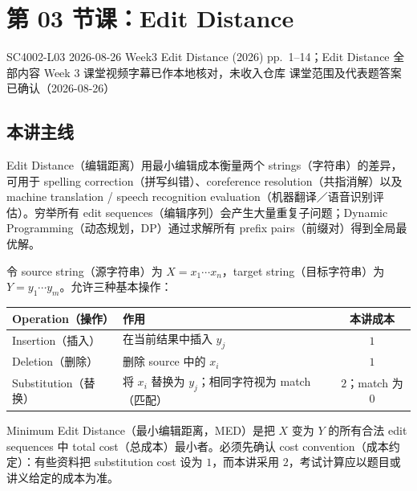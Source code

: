 
\section{第 03 节课：Edit Distance}
\label{lecture:SC4002-L03}

\lecturemeta
  {SC4002-L03}
  {2026-08-26}
  {Week3 Edit Distance (2026)}
  {pp.~1--14；Edit Distance 全部内容}
  {Week 3 课堂视频字幕已作本地核对，未收入仓库}
  {课堂范围及代表题答案已确认（2026-08-26）}

\subsection{本讲主线}

Edit Distance（编辑距离）用最小编辑成本衡量两个 strings（字符串）的差异，可用于 spelling correction（拼写纠错）、coreference resolution（共指消解）以及 machine translation / speech recognition evaluation（机器翻译／语音识别评估）。穷举所有 edit sequences（编辑序列）会产生大量重复子问题；Dynamic Programming（动态规划，DP）通过求解所有 prefix pairs（前缀对）得到全局最优解。


令 source string（源字符串）为 $X=x_1\cdots x_n$，target string（目标字符串）为 $Y=y_1\cdots y_m$。允许三种基本操作：

\begin{center}
\small
\begin{tabularx}{0.88\textwidth}{@{}>{\raggedright\arraybackslash}p{3.2cm}Xc@{}}
  \toprule
  Operation（操作） & 作用 & 本讲成本 \\
  \midrule
  Insertion（插入） & 在当前结果中插入 $y_j$ & $1$ \\
  Deletion（删除） & 删除 source 中的 $x_i$ & $1$ \\
  Substitution（替换） & 将 $x_i$ 替换为 $y_j$；相同字符视为 match（匹配） & $2$；match 为 $0$ \\
  \bottomrule
\end{tabularx}
\end{center}

Minimum Edit Distance（最小编辑距离，MED）是把 $X$ 变为 $Y$ 的所有合法 edit sequences 中 total cost（总成本）最小者。必须先确认 cost convention（成本约定）：有些资料把 substitution cost 设为 $1$，而本讲采用 $2$，考试计算应以题目或讲义给定的成本为准。

